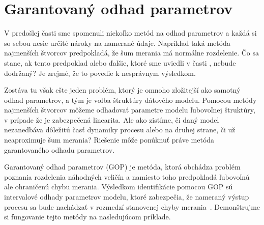 \chapter{Garantovaný odhad parametrov}
V predošlej časti sme spomenuli niekoľko metód na odhad parametrov a každá si so sebou nesie určité nároky na namerané údaje. Napríklad taká metóda najmenších štvorcov predpokladá, že šum merania má normálne rozdelenie. Čo sa stane, ak tento predpoklad alebo ďalšie, ktoré sme uviedli v časti , nebude dodržaný? Je zrejmé, že to povedie k nesprávnym výsledkom. 

Zostáva tu však ešte jeden problém, ktorý je omnoho zložitejší ako samotný odhad parametrov, a tým je voľba štruktúry dátového modelu. Pomocou metódy najmenších štvorcov môžeme odhadovať parametre modelu ľubovoľnej štruktúry, v prípade že je zabezpečená linearita. Ale ako zistíme, či daný model nezanedbáva dôležitú časť dynamiky procesu alebo na druhej strane, či už neaproximuje šum merania? Riešenie môže ponúknuť práve metóda garantovaného odhadu parametrov.

Garantovaný odhad parametrov (GOP) je metóda, ktorá obchádza problém poznania rozdelenia náhodných veličín a namiesto toho predpokladá ľubovoľnú ale ohraničenú chybu merania. Výsledkom identifikácie pomocou GOP sú intervalové odhady parametrov modelu, ktoré zabezpečia, že nameraný výstup procesu sa bude nachádzať v rozmedzí stanovenej chyby merania~\cite{paulen:gpe:2017}. Demonštrujme si fungovanie tejto metódy na nasledujúcom príklade.

